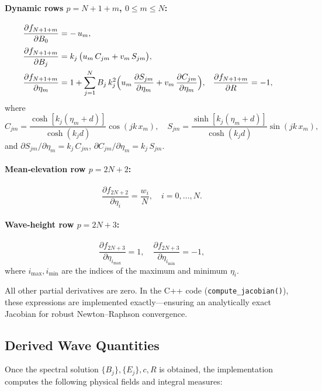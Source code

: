 \documentclass{article}
\begin{document}
\paragraph{Dynamic rows \(p=N+1+m\), \(0\le m\le N\):}
\begin{align}
\frac{\partial f_{N+1+m}}{\partial B_{0}}
  &= -\,u_{m},
  \\[0.5ex]
\frac{\partial f_{N+1+m}}{\partial B_{j}}
  &= k_{j}\,\bigl(u_{m}\,C_{jm} + v_{m}\,S_{jm}\bigr),
  \\
\frac{\partial f_{N+1+m}}{\partial \eta_{m}}
  &= 1
     + \sum_{j=1}^{N}
       B_{j}\,k_{j}^{2}
       \Bigl(u_{m}\,\frac{\partial S_{jm}}{\partial \eta_{m}}
           + v_{m}\,\frac{\partial C_{jm}}{\partial \eta_{m}}\Bigr),
  &
\frac{\partial f_{N+1+m}}{\partial R}
  &= -1,
\end{align}
where
\[
C_{jm} = \frac{\cosh[k_{j}(\eta_{m}+d)]}{\cosh(k_{j}d)}\cos(jk\,x_{m}), 
\quad
S_{jm} = \frac{\sinh[k_{j}(\eta_{m}+d)]}{\cosh(k_{j}d)}\sin(jk\,x_{m}),
\]
and
\(\partial S_{jm}/\partial \eta_{m} = k_{j} \,C_{jm}\), 
\(\partial C_{jm}/\partial \eta_{m} = k_{j} \,S_{jm}.\)

\paragraph{Mean‐elevation row \(p=2N+2\):}
\[
\frac{\partial f_{2N+2}}{\partial \eta_{i}}
  = \frac{w_i}{N},\quad i=0,\dots,N.
\]

\paragraph{Wave‐height row \(p=2N+3\):}
\[
\frac{\partial f_{2N+3}}{\partial \eta_{i_{\max}}} = 1,
\quad
\frac{\partial f_{2N+3}}{\partial \eta_{i_{\min}}} = -1,
\]
where \(i_{\max},i_{\min}\) are the indices of the maximum and minimum \(\eta_{i}\).

\medskip
All other partial derivatives are zero.  In the C++ code (\texttt{compute\_jacobian()}), these expressions are implemented exactly—ensuring an analytically exact Jacobian for robust Newton–Raphson convergence.

\subsection{Derived Wave Quantities}
\label{sec:derived_quantities}

Once the spectral solution \(\{B_j\},\{E_j\},c,R\) is obtained, the implementation computes the following physical fields and integral measures:
\end{document}
